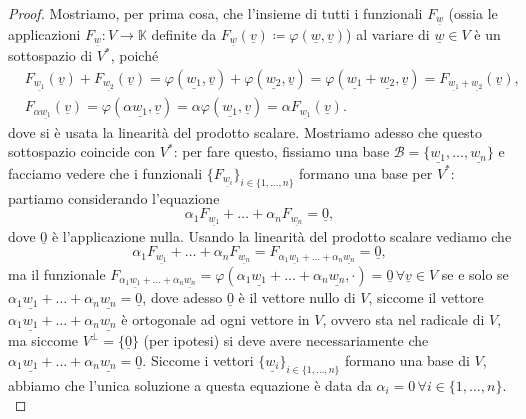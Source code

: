 \begin{proof}
    Mostriamo, per prima cosa, che l'insieme di tutti i funzionali $F_{\underline{w}}$ (ossia le applicazioni $F_{\underline{w}}: V \to \mathbb{K}$ definite da $F_{\underline{w}}(\underline{v}) \coloneqq \varphi(\underline{w}, \underline{v})$) al variare di $\underline{w} \in V$ è un sottospazio di $V^\ast$, poiché
    \begin{align}
        &F_{\underline{w_1}}(\underline{v}) + F_{\underline{w_2}}(\underline{v})
        = \varphi(\underline{w_1},\underline{v}) + \varphi(\underline{w_2},\underline{v})
        = \varphi(\underline{w_1} + \underline{w_2},\underline{v})
        = F_{\underline{w_1} + \underline{w_2}}(\underline{v}), \\
        &F_{\alpha \underline{w_1}}(\underline{v})
        = \varphi(\alpha \underline{w_1},\underline{v})
        = \alpha \varphi(\underline{w_1},\underline{v})
        = \alpha F_{\underline{w_1}}(\underline{v}).
    \end{align}
    dove si è usata la linearità del prodotto scalare. Mostriamo adesso che questo sottospazio coincide con $V^\ast$: per fare questo, fissiamo una base $\mathcal{B} = \{ \underline{w_1}, \ldots, \underline{w_n} \}$ e facciamo vedere che i funzionali $\{ F_{\underline{w_i}}\}_{i \in \{1,\ldots,n\}}$ formano una base per $V^\ast$: partiamo considerando l'equazione
    $$
        \alpha_1 F_{\underline{w_1}} + \ldots + \alpha_n F_{\underline{w_n}} = \underline{0},
    $$
    dove $\underline{0}$ è l'applicazione nulla. Usando la linearità del prodotto scalare vediamo che
    $$
        \alpha_1 F_{\underline{w_1}} + \ldots + \alpha_n F_{\underline{w_n}} = F_{\alpha_1 \underline{w_1} + \ldots + \alpha_n \underline{w_n}} = \underline{0},
    $$
    ma il funzionale $F_{\alpha_1 \underline{w_1} + \ldots + \alpha_n \underline{w_n}} = \varphi(\alpha_1 \underline{w_1} + \ldots + \alpha_n \underline{w_n}, \cdot) = \underline{0} \, \forall \underline{v} \in V$ se e solo se $\alpha_1 \underline{w_1} + \ldots + \alpha_n \underline{w_n} = \underline{0}$, dove adesso $\underline{0}$ è il vettore nullo di $V$, siccome il vettore $\alpha_1 \underline{w_1} + \ldots + \alpha_n \underline{w_n}$ è ortogonale ad ogni vettore in $V$, ovvero sta nel radicale di $V$, ma siccome $V^\perp = \{\underline{0}\}$ (per ipotesi) si deve avere necessariamente che $\alpha_1 \underline{w_1} + \ldots + \alpha_n \underline{w_n} = \underline{0}$. Siccome i vettori $\{\underline{w_i}\}_{i \in \{ 1,\ldots, n\}}$ formano
    una base di $V$, abbiamo che l'unica soluzione a questa equazione è data da $\alpha_i = 0 \, \forall i \in \{ 1, \ldots, n \}$. \\

\end{proof}
